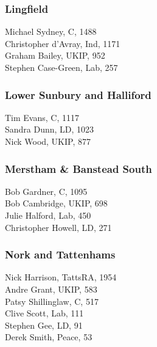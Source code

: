 \documentclass[a4paper,openany,10pt]{book}
\begin{document}
\subsubsection*{Lingfield}



Michael Sydney, C, 1488\\
Christopher d'Avray, Ind, 1171\\
Graham Bailey, UKIP, 952\\
Stephen Case-Green, Lab, 257\\


\subsubsection*{Lower Sunbury and Halliford}



Tim Evans, C, 1117\\
Sandra Dunn, LD, 1023\\
Nick Wood, UKIP, 877\\


\subsubsection*{Merstham \& Banstead South}



Bob Gardner, C, 1095\\
Bob Cambridge, UKIP, 698\\
Julie Halford, Lab, 450\\
Christopher Howell, LD, 271\\


\subsubsection*{Nork and Tattenhams}



Nick Harrison, TattsRA, 1954\\
Andre Grant, UKIP, 583\\
Patsy Shillinglaw, C, 517\\
Clive Scott, Lab, 111\\
Stephen Gee, LD, 91\\
Derek Smith, Peace, 53\\
\end{document}
